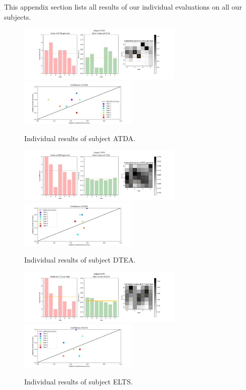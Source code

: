 \documentclass[../main/main.tex]{subfiles}
\begin{document}
	This appendix section lists all results of our individual evaluations on all our subjects.
	\begin{figure}[H]
		\centering
		\captionsetup{justification=centering}
		\includegraphics[width=0.7\textwidth]{../assets/ATDA_results.png}
		\includegraphics[width=0.5\textwidth]{../assets/ATDA_confidence.png}
		\caption{Individual results of subject ATDA.} 
		\label{fig:ATDA}
	\end{figure}
	\begin{figure}[H]
		\centering
		\captionsetup{justification=centering}
		\includegraphics[width=0.7\textwidth]{../assets/DTEA_results.png}
		\includegraphics[width=0.5\textwidth]{../assets/DTEA_confidence.png}
		\caption{Individual results of subject DTEA.} 
		\label{fig:DTEA}
	\end{figure}
	\begin{figure}[H]
		\centering
		\captionsetup{justification=centering}
		\includegraphics[width=0.7\textwidth]{../assets/ELTS_results.png}
		\includegraphics[width=0.5\textwidth]{../assets/ELTS_confidence.png}
		\caption{Individual results of subject ELTS.} 
		\label{fig:ELTS}
	\end{figure}
\end{document}
